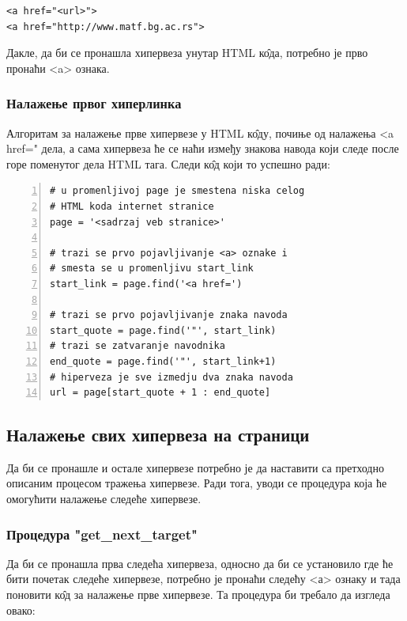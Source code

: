 \begin{lstlisting}[caption = <a> ознака, label = a_tag]
<a href="<url>">
<a href="http://www.matf.bg.ac.rs">
\end{lstlisting}

Дакле, да би се пронашла хипервеза унутар HTML к\^{о}да, потребно је прво пронаћи <a> ознака.

\subsubsection{Налажење првог хиперлинка}

Алгоритам за налажење прве хипервезе у HTML к\^{о}ду, почиње од налажења <a href=" дела, а сама хипервеза ће се наћи између знакова навода који следе после горе поменутог дела HTML тага. Следи к\^{о}д који то успешно ради:

\begin{lstlisting}[caption = Налажење првог хиперлинка, label = {lst:first_url}, numbers = left]
# u promenljivoj page je smestena niska celog
# HTML koda internet stranice
page = '<sadrzaj veb stranice>'

# trazi se prvo pojavljivanje <a> oznake i
# smesta se u promenljivu start_link
start_link = page.find('<a href=')

# trazi se prvo pojavljivanje znaka navoda
start_quote = page.find('"', start_link)
# trazi se zatvaranje navodnika
end_quote = page.find('"', start_link+1)
# hiperveza je sve izmedju dva znaka navoda
url = page[start_quote + 1 : end_quote]
\end{lstlisting}

\subsection{Налажење свих хипервеза на страници}

Да би се пронашле и остале хипервезе потребно је да наставити са претходно описаним процесом тражења хипервезе. Ради тога, уводи се процедура која ће омогућити налажење следеће хипервезе.

\subsubsection{Процедура "get\_next\_target"}

Да би се пронашла прва следећа хипервеза, односно да би се установило где ће бити почетак следеће хипервезе, потребно је пронаћи следећу <а> ознаку и тада поновити к\^{о}д за налажење прве хипервезе. Та процедура би требало да изгледа овако:

